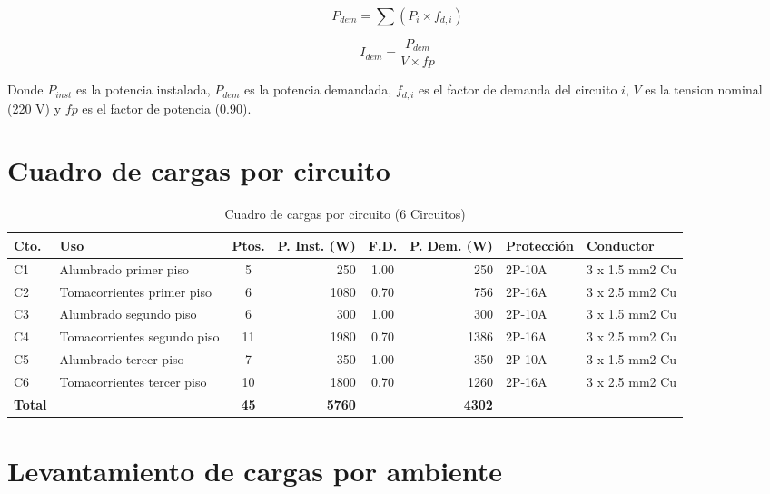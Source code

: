 \begin{equation}
P_{dem} = \sum (P_i \times f_{d,i})
\end{equation}

\begin{equation}
I_{dem} = \frac{P_{dem}}{V \times fp}
\end{equation}

Donde $P_{inst}$ es la potencia instalada, $P_{dem}$ es la potencia demandada, $f_{d,i}$ es el factor de demanda del circuito $i$, $V$ es la tension nominal (220 V) y $fp$ es el factor de potencia (0.90).

\section{Cuadro de cargas por circuito}

\begin{table}[H]
\centering
\small
\setlength{\tabcolsep}{3pt}
\caption{Cuadro de cargas por circuito (6 Circuitos)}
\label{tab:cuadro-cargas-circuito}
\begin{tabularx}{\textwidth}{l Y c r c r Y Y}
\toprule
\textbf{Cto.} & \textbf{Uso} & \textbf{Ptos.} & \textbf{P. Inst. (W)} & \textbf{F.D.} & \textbf{P. Dem. (W)} & \textbf{Protección} & \textbf{Conductor} \\
\midrule
C1 & Alumbrado primer piso & 5 & 250 & 1.00 & 250 & 2P-10A & 3 x 1.5 mm2 Cu \\
C2 & Tomacorrientes primer piso & 6 & 1080 & 0.70 & 756 & 2P-16A & 3 x 2.5 mm2 Cu \\
C3 & Alumbrado segundo piso & 6 & 300 & 1.00 & 300 & 2P-10A & 3 x 1.5 mm2 Cu \\
C4 & Tomacorrientes segundo piso & 11 & 1980 & 0.70 & 1386 & 2P-16A & 3 x 2.5 mm2 Cu \\
C5 & Alumbrado tercer piso & 7 & 350 & 1.00 & 350 & 2P-10A & 3 x 1.5 mm2 Cu \\
C6 & Tomacorrientes tercer piso & 10 & 1800 & 0.70 & 1260 & 2P-16A & 3 x 2.5 mm2 Cu \\
\textbf{Total} &  & \textbf{45} & \textbf{5760} &  & \textbf{4302} &  &  \\
\bottomrule
\end{tabularx}
\end{table}

\section{Levantamiento de cargas por ambiente}

